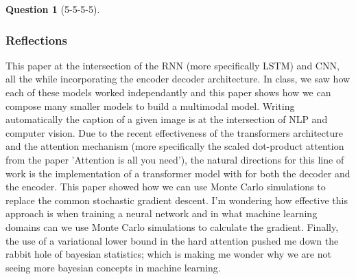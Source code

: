 \documentclass[12pt]{article}
\theoremstyle{definition}
\newtheorem{exercise}{Question}%
\begin{document}
\begin{exercise}[5-5-5-5]
{    \subsubsection*{Reflections}
    This paper at the intersection of the RNN (more specifically LSTM) and CNN,
    all the while incorporating the encoder decoder architecture. In class, we saw
    how each of these models worked independantly and this paper shows how we can
    compose many smaller models to build a multimodal model.  Writing automatically
    the caption of a given image is at the intersection of NLP and computer vision.
    Due to the recent effectiveness of the transformers architecture and the
    attention mechanism (more specifically the scaled dot-product attention from the
    paper 'Attention is all you need'), the natural directions for this line of work
    is the implementation of a transformer model with for both the decoder and the
    encoder.
    This paper showed how we can use Monte Carlo simulations to replace the
    common stochastic gradient descent. I'm wondering how effective this approach is
    when training a neural network and in what machine learning domains can we use
    Monte Carlo simulations to calculate the gradient. Finally, the use of a
    variational lower bound in the hard attention pushed me down the rabbit hole of
    bayesian statistics; which is making me wonder why we are not seeing more
    bayesian concepts in machine learning.
    }
\end{exercise}
\end{document}
